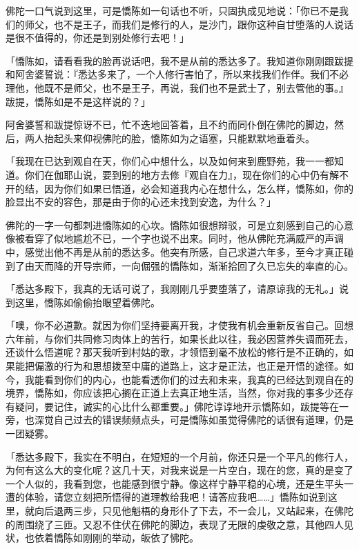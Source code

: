 \documentclass[twoside,openany]{book}
\begin{document}
佛陀一口气说到这里，可是憍陈如一句话也不听，只固执成见地说：「你已不是我们的师父，也不是王子，而我们是修行的人，是沙门，跟你这种自甘堕落的人说话是很不值得的，你还是到别处修行去吧！」

「憍陈如，请看看我的脸再说话吧，我不是从前的悉达多了。我知道你刚刚跟跋提和阿舍婆誓说：『悉达多来了，一个人修行害怕了，所以来找我们作伴。我们不必理他，他既不是师父，也不是王子，再说，我们也不是武士了，别去管他的事。』跋提，憍陈如是不是这样说的？」

阿舍婆誓和跋提惊讶不已，忙不迭地回答着，且不约而同仆倒在佛陀的脚边，然后，两人抬起头来仰视佛陀的脸，憍陈如为之语塞，只能默默地垂着头。

「我现在已达到观自在天，你们心中想什么，以及如何来到鹿野苑，我一一都知道。你们在伽耶山说，要到别的地方去修『观自在力』，现在你们的心中仍有解不开的结，因为你们如果已悟道，必会知道我内心在想什么，怎么样，憍陈如，你的脸显出不安的容色，那是由于你的心还未找到安逸，为什么？」

佛陀的一字一句都刺进憍陈如的心坎。憍陈如很想辩驳，可是立刻感到自己的心意像被看穿了似地尴尬不已，一个字也说不出来。同时，他从佛陀充满威严的声调中，感觉出他不再是从前的悉达多。他突有所感，自己求道六年多，至今才真正碰到了由天而降的开导宗师，一向倔强的憍陈如，渐渐拾回了久已忘失的率直的心。

「悉达多殿下，我真的无话可说了，我刚刚几乎要堕落了，请原谅我的无礼。」说到这里，憍陈如偷偷抬眼望着佛陀。

「噢，你不必道歉。就因为你们坚持要离开我，才使我有机会重新反省自己。回想六年前，与你们共同修习肉体上的苦行，如果长此以往，我必因营养失调而死去，还谈什么悟道呢？那天我听到村姑的歌，才领悟到毫不放松的修行是不正确的，如果能把偏激的行为和思想拨至中庸的道路上，这才是正法，也正是开悟的途径。如今，我能看到你们的内心，也能看透你们的过去和未来，我真的已经达到观自在的境界，憍陈如，你应该把心搁在正道上去真正地生活，当然，你对我的事多少还存有疑问，要记住，诚实的心比什么都重要。」佛陀谆谆地开示憍陈如，跋提等在一旁，也深觉自己过去的错误频频点头，可是憍陈如虽觉得佛陀的话很有道理，仍是一团疑雾。

「悉达多殿下，我实在不明白，在短短的一个月前，你还只是一个平凡的修行人，为何有这么大的变化呢？这几十天，对我来说是一片空白，现在的您，真的是变了一个人似的，我看到您，也能感到很宁静。像这样宁静平稳的心境，还是生平头一遭的体验，请您立刻把所悟得的道理教给我吧！请答应我吧……」憍陈如说到这里，就向后退两三步，只见他魁梧的身形仆了下去，不一会儿，又站起来，在佛陀的周围绕了三匝。又忍不住伏在佛陀的脚边，表现了无限的虔敬之意，其他四人见状，也依着憍陈如刚刚的举动，皈依了怫陀。
\end{document}
